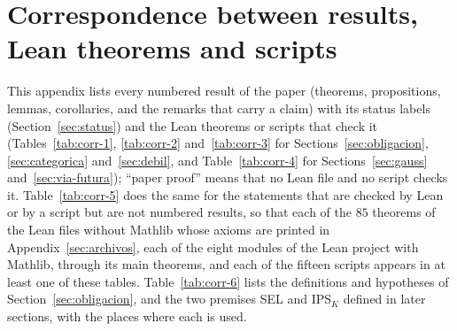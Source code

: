 \section{Correspondence between results, Lean theorems and scripts}\label{sec:correspondencia}
This appendix lists every numbered result of the paper (theorems, propositions, lemmas, corollaries, and the remarks that carry a claim) with its status labels (Section~\ref{sec:status}) and the Lean theorems or scripts that check it (Tables~\ref{tab:corr-1}, \ref{tab:corr-2} and~\ref{tab:corr-3} for Sections~\ref{sec:obligacion}, \ref{sec:categorica} and~\ref{sec:debil}, and Table~\ref{tab:corr-4} for Sections~\ref{sec:gauss} and~\ref{sec:via-futura}); ``paper proof'' means that no Lean file and no script checks it. Table~\ref{tab:corr-5} does the same for the statements that are checked by Lean or by a script but are not numbered results, so that each of the $85$ theorems of the Lean files without Mathlib whose axioms are printed in Appendix~\ref{sec:archivos}, each of the eight modules of the Lean project with Mathlib, through its main theorems, and each of the fifteen scripts appears in at least one of these tables. Table~\ref{tab:corr-6} lists the definitions and hypotheses of Section~\ref{sec:obligacion}, and the two premises SEL and IPS$_K$ defined in later sections, with the places where each is used.


